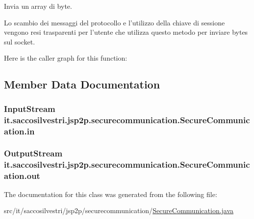 \-Invia un array di byte. 

\-Lo scambio dei messaggi del protocollo e l'utilizzo della chiave di sessione vengono resi trasparenti per l'utente che utilizza questo metodo per inviare bytes sul socket. 

\-Here is the caller graph for this function\-:




\subsection{\-Member \-Data \-Documentation}
\hypertarget{classit_1_1saccosilvestri_1_1jsp2p_1_1securecommunication_1_1_secure_communication_a007b240b59e1189f3994e735dae50ea5}{
\subsubsection[{in}]{\setlength{\rightskip}{0pt plus 5cm}\-Input\-Stream {\bf it.\-saccosilvestri.\-jsp2p.\-securecommunication.\-Secure\-Communication.\-in}}}
\label{classit_1_1saccosilvestri_1_1jsp2p_1_1securecommunication_1_1_secure_communication_a007b240b59e1189f3994e735dae50ea5}
\hypertarget{classit_1_1saccosilvestri_1_1jsp2p_1_1securecommunication_1_1_secure_communication_a35e77cca97b78b630af1d7a4084133ad}{
\subsubsection[{out}]{\setlength{\rightskip}{0pt plus 5cm}\-Output\-Stream {\bf it.\-saccosilvestri.\-jsp2p.\-securecommunication.\-Secure\-Communication.\-out}}}
\label{classit_1_1saccosilvestri_1_1jsp2p_1_1securecommunication_1_1_secure_communication_a35e77cca97b78b630af1d7a4084133ad}


\-The documentation for this class was generated from the following file\-:\begin{DoxyCompactItemize}
\item 
src/it/saccosilvestri/jsp2p/securecommunication/\hyperlink{_secure_communication_8java}{\-Secure\-Communication.\-java}\end{DoxyCompactItemize}
